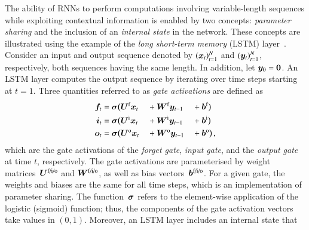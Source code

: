 
The ability of RNNs to perform computations involving variable-length sequences
while exploiting contextual information is enabled by two concepts:
\emph{parameter sharing} and the inclusion of an \emph{internal state} in the
network. These concepts are illustrated using the example of the \emph{long
  short-term memory} (LSTM) layer~\cite{lstm,gers2000learning}. Consider an
input and output sequence denoted by $(\bm{x}_{t})_{t = 1}^{N}$ and
$(\bm{y}_{t})_{t = 1}^{N}$, respectively, both sequences having the same
length. In addition, let $\bm{y}_{0} = \bm{0}$. An LSTM layer computes the
output sequence by iterating over time steps starting at $t = 1$. Three
quantities referred to as \emph{gate activations} are defined
as~\cite{Goodfellow-et-al-2016}
\begin{alignat*}{3}
  \myvec{f}_{t} &= \myvec{\sigma}\bigl(\myvec{U}^{\text{f}}  \myvec{x}_{t} &&+ \myvec{W}^{\text{f}}  \myvec{y}_{t - 1} &&+ \myvec{b}^{\text{f}}\bigr) \\
  \myvec{i}_{t} &= \myvec{\sigma}\bigl(\myvec{U}^{\text{i}}  \myvec{x}_{t} &&+ \myvec{W}^{\text{i}}  \myvec{y}_{t - 1} &&+ \myvec{b}^{\text{i}}\bigr) \\
  \myvec{o}_{t} &= \myvec{\sigma}\bigl(\myvec{U}^{\text{o}}  \myvec{x}_{t} &&+ \myvec{W}^{\text{o}}  \myvec{y}_{t - 1} &&+ \myvec{b}^{\text{o}}\bigr) \,\text{,}                                                       %
\end{alignat*}
which are the gate activations of the \emph{forget gate}, \emph{input gate}, and
the \emph{output gate} at time $t$, respectively. The gate activations are
parameterised by weight matrices~$\bm{U}^{\text{f/i/o}}$ and
$\bm{W}^{\text{f/i/o}}$, as well as bias
vectors~$\bm{b}^{\text{f/i/o}}$. For a given gate, the weights and biases are
the same for all time steps, which is an implementation of parameter sharing.
The function~$\bm{\sigma}$ refers to the element-wise application of the
logistic (sigmoid) function; thus, the components of the gate activation vectors
take values in $(0, 1)$. Moreover, an LSTM layer includes an internal state that
